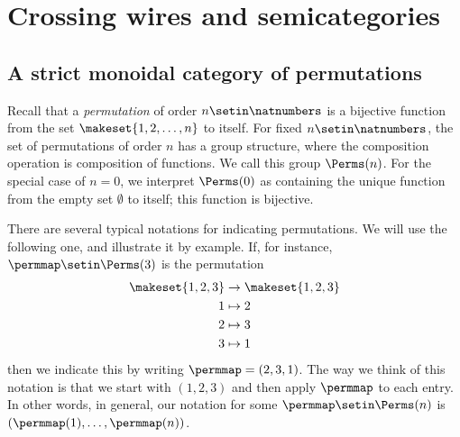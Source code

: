 
\section{Crossing wires and semicategories}
\label{sec:symmetric-stacking-semicategories}



\subsection{A strict monoidal category of permutations}
\label{sec:parallelism-and-permutations}




Recall that a \emph{permutation} of order $n \setin\natnumbers$ is a bijective function from the set $\makeset{1,2, \dots , n}$ to itself.
For fixed $n \setin\natnumbers$, the set of permutations of order $n$ has a group structure, where the composition operation is composition of functions.
We call this group $\Perms(n)$.
For the special case of $n = 0$, we interpret $\Perms(0)$ as containing the unique function from the empty set $\emptyset$ to itself; this function is bijective.

There are several typical notations for indicating permutations.
We will use the following one, and illustrate it by example.
If, for instance, $\permmap \setin \Perms(3)$ is the permutation
\begin{align*}
    \makeset{1,2,3} & \to \makeset{1,2,3} \\
    1               & \mapsto 2 \\
    2               & \mapsto 3 \\
    3               & \mapsto 1
\end{align*}
then we indicate this by writing $\permmap = (2, 3, 1)$.
The way we think of this notation is that we start with $(1, 2, 3)$ and then apply $\permmap$ to each entry.
In other words, in general, our notation for some $\permmap \setin \Perms(n)$ is $(\permmap(1), \dots, \permmap(n))$.

